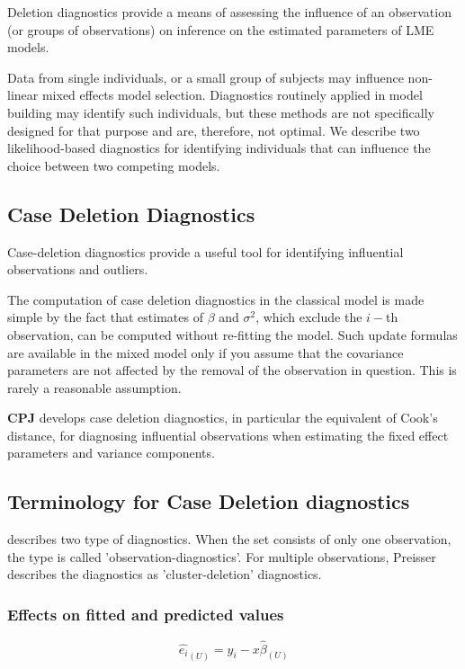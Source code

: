 \documentclass[Main.tex]{subfiles}
\begin{document}
	Deletion diagnostics provide a means of assessing the influence of an observation (or groups of observations) on inference on the estimated parameters of LME models.
	
	Data from single individuals, or a small group of subjects may influence non-linear mixed effects model selection. Diagnostics routinely applied in model building may identify such individuals, but these methods are not specifically designed for that purpose and are, therefore, not optimal. We describe two likelihood-based diagnostics for identifying individuals that can influence the choice between two competing models.
		\subsection{Case Deletion Diagnostics} %
	Case-deletion diagnostics provide a useful tool for identifying influential observations and outliers.
	
	The computation of case deletion diagnostics in the classical model is made simple by the fact that estimates of $\beta$ and $\sigma^2$, which exclude the $i-$th observation, can be computed without re-fitting the model. Such update formulas are available in the mixed model only if you assume that the covariance parameters are not affected by the removal of the observation in question. This is rarely a reasonable assumption.

	
	\textbf{CPJ} develops  case deletion diagnostics, in particular the equivalent of  Cook's distance, for diagnosing influential observations when estimating the fixed effect parameters and variance components.
	
	\subsection{Terminology for Case Deletion diagnostics} %
	
	\citet{preisser} describes two type of diagnostics. When the set consists of only one observation, the type is called
	'observation-diagnostics'. For multiple observations, Preisser describes the diagnostics as 'cluster-deletion' diagnostics.
		
	\subsubsection{Effects on fitted and predicted values}
	\begin{equation}
	\hat{e_{i}}_{(U)} = y_{i} - x\hat{\beta}_{(U)}
	\end{equation}
	\newpage
	
\end{document}
